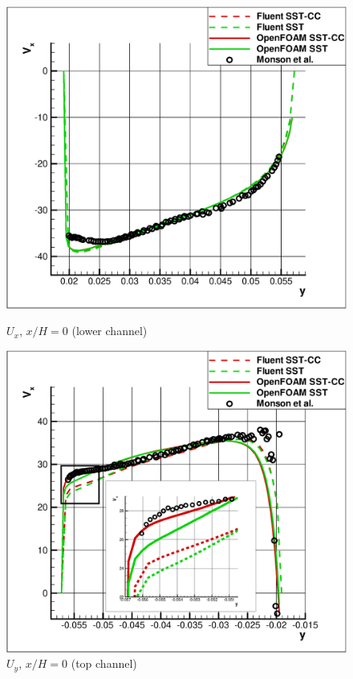 \documentclass[a4paper]{jpconf}
\begin{document}
\begin{figure}[ht]
	\begin{minipage}{0.45\linewidth}
		\includegraphics[scale=0.33]{xh0up}
		\caption{$U_x$, $x/H=0$ (lower channel)}
		\label{fig:x0up}
	\end{minipage}
	\hspace{0.5em}
	\begin{minipage}{0.45\linewidth}
		\includegraphics[scale=0.33]{xh0down}
		\caption{$U_y$, $x/H=0$ (top channel)}
		\label{fig:x0down}
	\end{minipage}
\end{figure}
\end{document}
